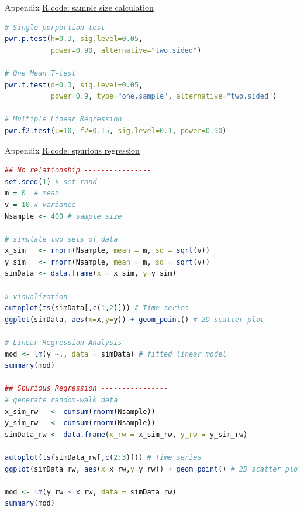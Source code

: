 \documentclass{beamer}
\begin{document}
\appendix
\begin{frame}[fragile]{Appendix}
    \underline{R code: sample size calculation}
    \fontsize{6pt}{6pt}\selectfont
    \begin{lstlisting}[language=R]
# Single porportion test
pwr.p.test(h=0.3, sig.level=0.05, 
           power=0.90, alternative="two.sided")

# One Mean T-test
pwr.t.test(d=0.3, sig.level=0.05,
           power=0.9, type="one.sample", alternative="two.sided")

# Multiple Linear Regression
pwr.f2.test(u=10, f2=0.15, sig.level=0.1, power=0.90)
    \end{lstlisting}
\end{frame}

\begin{frame}[fragile]{Appendix}
    \underline{R code: spurious regression}
    \fontsize{6pt}{6pt}\selectfont
    \begin{lstlisting}[language=R]
## No relationship ----------------
set.seed(1) # set rand 
m = 0  # mean
v = 10 # variance
Nsample <- 400 # sample size

# simulate two sets of data
x_sim   <- rnorm(Nsample, mean = m, sd = sqrt(v))
y_sim   <- rnorm(Nsample, mean = m, sd = sqrt(v))
simData <- data.frame(x = x_sim, y=y_sim)

# visualization
autoplot(ts(simData[,c(1,2)])) # Time series
ggplot(simData, aes(x=x,y=y)) + geom_point() # 2D scatter plot

# Linear Regression Analysis
mod <- lm(y ~., data = simData) # fitted linear model 
summary(mod)

## Spurious Regression ----------------
# generate random-walk data
x_sim_rw   <- cumsum(rnorm(Nsample)) 
y_sim_rw   <- cumsum(rnorm(Nsample))
simData_rw <- data.frame(x_rw = x_sim_rw, y_rw = y_sim_rw)

autoplot(ts(simData_rw[,c(2:3)])) # Time series
ggplot(simData_rw, aes(x=x_rw,y=y_rw)) + geom_point() # 2D scatter plot

mod <- lm(y_rw ~ x_rw, data = simData_rw)
summary(mod)
\end{lstlisting}
\end{frame}
\end{document}
